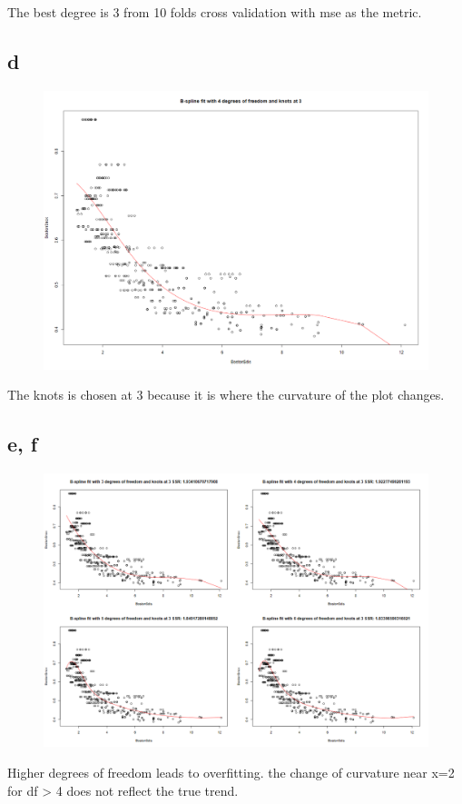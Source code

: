 \documentclass{article}
\begin{document}
The best degree is 3 from 10 folds cross validation with mse as the metric.

\subsection*{d}
\begin{figure}[h]
    \includegraphics[width=1\textwidth]{figs/q9-2.png}
    \caption{}
    \label{fig: q9-2}
\end{figure}
The knots is chosen at 3 because it is where the curvature of the plot changes.

\subsection*{e, f}
\begin{figure}[h]
    \includegraphics[width=1\textwidth]{figs/q9-3.png}
    \caption{}
    \label{fig: q9-3}
\end{figure}

Higher degrees of freedom leads to overfitting. the change of curvature near x=2 for df > 4 does not reflect the true trend.
\end{document}
